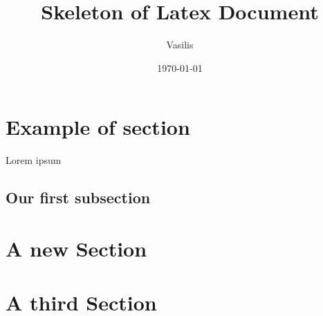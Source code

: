 \documentclass{article}
\title{Skeleton of Latex Document}
\author{Vasilis}
\date{\today}
\begin{document}
\maketitle

\tableofcontents

\section{Example of section}
Lorem ipsum

\subsection{Our first subsection}

\section*{A new Section}

\section{A third Section}
\end{document}
